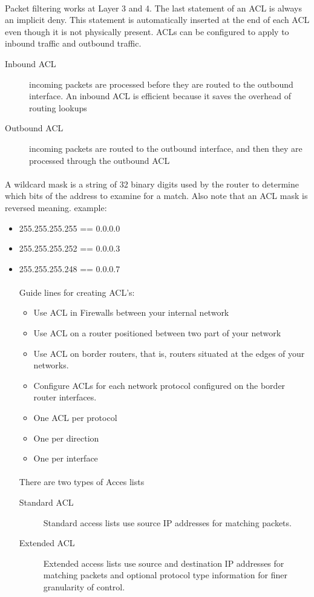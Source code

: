 \documentclass[10pt,landscape]{article}
\begin{document}
\begin{multicols}{3}
\paragraph{}
Packet filtering works at Layer 3 and 4. The last statement of an ACL is always an implicit deny. This statement is automatically inserted at the end of each ACL even though it is not physically present. ACLs can be configured to apply to inbound traffic and outbound traffic.
\begin{description}
	\item[Inbound ACL] incoming packets are processed before they are routed to the outbound interface. An inbound ACL is efficient because it saves the overhead of routing lookups
	\item[Outbound ACL] incoming packets are routed to the outbound interface, and then they are processed through the outbound ACL
\end{description}
\paragraph{}
A wildcard mask is a string of 32 binary digits used by the router to determine which bits of the address to examine for a match. Also note that an ACL mask is reversed meaning.
example:
\begin{itemize}
	\item 255.255.255.255 == 0.0.0.0
	\item 255.255.255.252 == 0.0.0.3
	\item 255.255.255.248 == 0.0.0.7
\paragraph{}
Guide lines for creating ACL's:
\begin{itemize}
	\item Use ACL in Firewalls between your internal network
	\item Use ACL on a router positioned between two part of your network
	\item Use ACL on border routers, that is, routers situated at the edges of your networks.
	\item Configure ACLs for each network protocol configured on the border router interfaces.
	\item One ACL per protocol
	\item One per direction
	\item One per interface
\end{itemize}
\paragraph{}
There are two types of Acces lists
\begin{description}
	\item[Standard ACL] Standard access lists use source IP addresses for matching packets.
	\item[Extended ACL] Extended access lists use source and destination IP addresses for matching packets and optional protocol type information for finer granularity of control.
\end{description}


\end{itemize}
\end{multicols}
\end{document}
